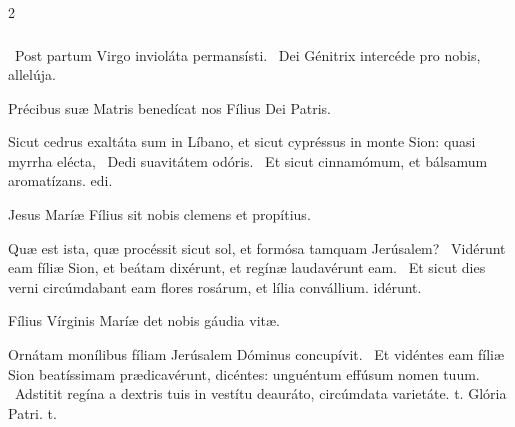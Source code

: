 \documentclass[9pt,twoside]{extarticle}
\begin{document}
\begin{multicols}{2}
\subsubsection*{}
\begin{tightlist}{}
\item {}~Post partum Virgo invioláta permansísti. ~Dei Génitrix intercéde pro nobis, allelúja.
\item {\small {} Précibus suæ Matris benedícat nos Fílius Dei Patris.}
\item {} Sicut cedrus exaltáta sum in Líbano, et sicut cypréssus in monte Sion: quasi myrrha elécta, \textred{*}~Dedi suavitátem odóris.
~Et sicut cinnamómum, et bálsamum aromatízans. edi.
\item {\small {} Jesus Maríæ Fílius sit nobis clemens et propítius.}
\item {} Quæ est ista, quæ procéssit sicut sol, et formósa tamquam Jerúsalem? \textred{*}~Vidérunt eam fíliæ Sion, et beátam dixérunt, et regínæ laudavérunt eam.
~Et sicut dies verni circúmdabant eam flores rosárum, et lília convállium. idérunt.
\item {\small {} Fílius Vírginis Maríæ det nobis gáudia vitæ.}
\item {} Ornátam monílibus fíliam Jerúsalem Dóminus concupívit. \textred{*}~Et vidéntes eam fíliæ Sion beatíssimam prædicavérunt, dicéntes: unguéntum effúsum nomen tuum.
~Adstitit regína a dextris tuis in vestítu deauráto, circúmdata varietáte. t. Glória Patri. t.
\end{tightlist}


\end{multicols}
\end{document}

